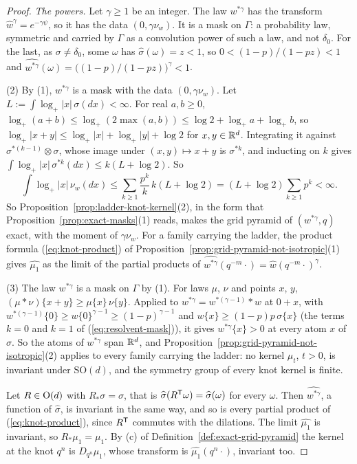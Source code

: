 \begin{proof}
\emph{The powers.} Let $\gamma \ge 1$ be an integer. The law $w^{*\gamma}$ has the transform
$\widehat{w}^\gamma = e^{-\gamma\psi}$, so it has the data $(0, \gamma\nu_w)$. It is a mask on
$\Gamma$: a probability law, symmetric and carried by $\Gamma$ as a convolution power of such a
law, and not $\delta_0$. For the last, as $\sigma \ne \delta_0$, some $\omega$ has
$\widehat{\sigma}(\omega) = z < 1$, so $0 < (1-p)/(1-pz) < 1$ and
$\widehat{w^{*\gamma}}(\omega) = \bigl((1-p)/(1-pz)\bigr)^\gamma < 1$.

(2) By (1), $w^{*\gamma}$ is a mask with the data $(0, \gamma\nu_w)$. Let
$L := \int\log_+|x|\,\sigma(dx) < \infty$. For real $a, b \ge 0$,
$\log_+(a + b) \le \log_+(2\max(a, b)) \le \log 2 + \log_+a + \log_+b$, so
$\log_+|x + y| \le \log_+|x| + \log_+|y| + \log 2$ for $x, y \in \mathbb{R}^d$. Integrating it against
$\sigma^{*(k-1)} \otimes \sigma$, whose image under $(x, y) \mapsto x + y$ is $\sigma^{*k}$, and
inducting on $k$ gives $\int\log_+|x|\,\sigma^{*k}(dx) \le k(L + \log 2)$. So
\[
\int\log_+|x|\,\nu_w(dx) \le \sum_{k \ge 1}\frac{p^k}{k}\,k(L + \log 2)
= (L + \log 2)\sum_{k \ge 1}p^k < \infty .
\]
So Proposition~\ref{prop:ladder-knot-kernel}(2), in the form that
Proposition~\ref{prop:exact-masks}(1) reads, makes the grid pyramid of $(w^{*\gamma}, q)$ exact,
with the moment of $\gamma\nu_w$. For a family carrying the ladder, the product formula
(\ref{eq:knot-product}) of Proposition~\ref{prop:grid-pyramid-not-isotropic}(1) gives
$\widehat{\mu_1}$ as the limit of the partial products of
$\widehat{w^{*\gamma}}(q^{-m}\cdot) = \widehat{w}(q^{-m}\cdot)^\gamma$.

(3) The law $w^{*\gamma}$ is a mask on $\Gamma$ by (1). For laws $\mu$, $\nu$ and points $x$, $y$,
$(\mu * \nu)\{x + y\} \ge \mu\{x\}\,\nu\{y\}$. Applied to $w^{*\gamma} = w^{*(\gamma - 1)} * w$ at
$0 + x$, with $w^{*(\gamma - 1)}\{0\} \ge w\{0\}^{\gamma - 1} \ge (1-p)^{\gamma - 1}$ and
$w\{x\} \ge (1-p)p\,\sigma\{x\}$ (the terms $k = 0$ and $k = 1$ of (\ref{eq:resolvent-mask})), it
gives $w^{*\gamma}\{x\} > 0$ at every atom $x$ of $\sigma$. So the atoms of $w^{*\gamma}$ span
$\mathbb{R}^d$, and Proposition~\ref{prop:grid-pyramid-not-isotropic}(2) applies to every family carrying
the ladder: no kernel $\mu_t$, $t > 0$, is invariant under $\mathrm{SO}(d)$, and the symmetry group of every
knot kernel is finite.

Let $R \in \mathrm{O}(d)$ with $R_*\sigma = \sigma$, that is $\widehat{\sigma}(R^{\mathsf{T}}\omega) =
\widehat{\sigma}(\omega)$ for every $\omega$. Then $\widehat{w^{*\gamma}}$, a function of
$\widehat{\sigma}$, is invariant in the same way, and so is every partial product of
(\ref{eq:knot-product}), since $R^{\mathsf{T}}$ commutes with the dilations. The limit
$\widehat{\mu_1}$ is invariant, so $R_*\mu_1 = \mu_1$. By (c) of
Definition~\ref{def:exact-grid-pyramid} the kernel at the knot $q^n$ is $D_{q^n}\mu_1$, whose
transform is $\widehat{\mu_1}(q^n\cdot)$, invariant too.


\end{proof}
